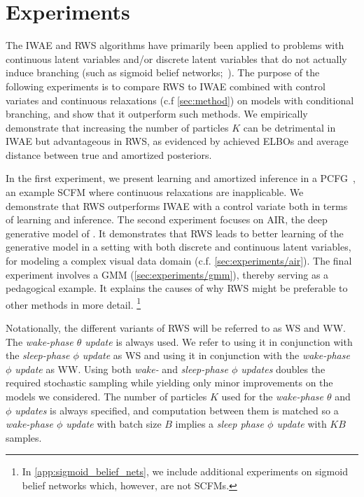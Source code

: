 
\section{Experiments}
\label{sec:experiments}


The \gls{IWAE} and \gls{RWS} algorithms have primarily been applied to problems with continuous latent variables and/or discrete latent variables that do not actually induce branching (such as sigmoid belief networks;~\cite{Neal1992connectionist}).
The purpose of the following experiments is to compare \gls{RWS} to \gls{IWAE} combined with control variates and continuous relaxations (c.f \cref{sec:method}) on models with conditional branching, and show that it outperform such methods.
We empirically demonstrate that increasing the number of particles $K$ can be detrimental in \gls{IWAE} but advantageous in \gls{RWS}, as evidenced by achieved \glspl{ELBO} and average distance between true and amortized posteriors.

In the first experiment, we present learning and amortized inference in a \gls{PCFG}~\citep{Booth1973applying}, an example \gls{SCFM} where continuous relaxations are inapplicable.
We demonstrate that \gls{RWS} outperforms \gls{IWAE} with a control variate both in terms of learning and inference.
The second experiment focuses on \gls{AIR}, the deep generative model of \cite{Eslami2016attend}.
It demonstrates that \gls{RWS} leads to better learning of the generative model in a setting with both discrete and continuous latent variables, for modeling a complex visual data domain (c.f. \cref{sec:experiments/air}).
The final experiment involves a \gls{GMM} (\cref{sec:experiments/gmm}), thereby serving as a pedagogical example.
It explains the causes of why \gls{RWS} might be preferable to other methods in more detail.
\footnote{In \cref{app:sigmoid_belief_nets}, we include additional experiments on sigmoid belief networks which, however, are not \glspl{SCFM}.}


Notationally, the different variants of \gls{RWS} will be referred to as \gls{WS} and \gls{WW}.
The \emph{wake-phase $\theta$ update} is always used.
We refer to using it in conjunction with the \emph{sleep-phase $\phi$ update} as \acrshort{WS} and using it in conjunction with the \emph{wake-phase $\phi$ update} as \acrshort{WW}.
Using both \emph{wake-} and \emph{sleep-phase $\phi$ updates} doubles the required stochastic sampling while yielding only minor improvements on the models we considered.
The number of particles $K$ used for the \emph{wake-phase $\theta$} and \emph{$\phi$ updates} is always specified, and computation between them is matched so
a \emph{wake-phase $\phi$ update} with batch size $B$ implies a \emph{sleep phase $\phi$ update} with $KB$ samples.

